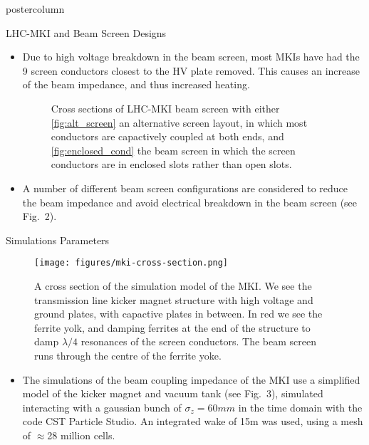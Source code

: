 \documentclass[final,hyperref={pdfpagelabels=false}]{beamer}
\begin{document}
\begin{frame}
\begin{columns}
\begin{column}{.49\textwidth}
\begin{beamercolorbox}[center,wd=\textwidth]{postercolumn}
\begin{minipage}[T]{.95\textwidth}
{\begin{block}{LHC-MKI and Beam Screen Designs}
\begin{itemize}
\item{Due to high voltage breakdown in the beam screen, most MKIs have had the 9 screen conductors closest to the HV plate removed. This causes an increase of the beam impedance, and thus increased heating.}

\begin{figure}
\label{fig:alternatives}
\caption{Cross sections of LHC-MKI beam screen with either \ref{fig:alt_screen} an alternative screen layout, in which most conductors are capactively coupled at both ends, and \ref{fig:enclosed_cond} the beam screen in which the screen conductors are in enclosed slots rather than open slots.}
\end{figure}
\item{A number of different beam screen configurations are considered to reduce the beam impedance and avoid electrical breakdown in the beam screen (see Fig.~2).}


	\end{itemize}
	\end{block}
 \vfill
\begin{block}{Simulations Parameters}

\begin{figure}
\texttt{[image: figures/mki-cross-section.png]}
\label{fig:kicker_xsec}
\caption{A cross section of the simulation model of the MKI. We see the transmission line kicker magnet structure with high voltage and ground plates, with capactive plates in between. In red we see the ferrite yolk, and damping ferrites at the end of the structure to damp $\lambda/4$ resonances of the screen conductors. The beam screen runs through the centre of the ferrite yoke.}
\end{figure}

\begin{itemize}
\item{The simulations of the beam coupling impedance of the MKI use a simplified model of the kicker magnet and vacuum tank (see Fig.~3), simulated interacting with a gaussian bunch of $\sigma_{z}=60mm$ in the time domain with the code CST Particle Studio. An integrated wake of 15m was used, using a mesh of $\approx$28 million cells.}

\end{itemize}


\end{block}}
\end{minipage}
\end{beamercolorbox}
\end{column}
\end{columns}
\end{frame}
\end{document}
